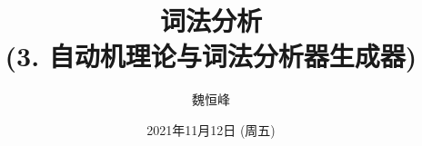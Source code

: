 \documentclass[]{beamer}
\title[词法分析]{词法分析 \\ (3. 自动机理论与词法分析器生成器)}
\author[魏恒峰]{\large 魏恒峰}
\institute{hfwei@nju.edu.cn}
\date{2021年11月12日 (周五)}
\begin{document}
\maketitle









\thankyou{}

\end{document}

